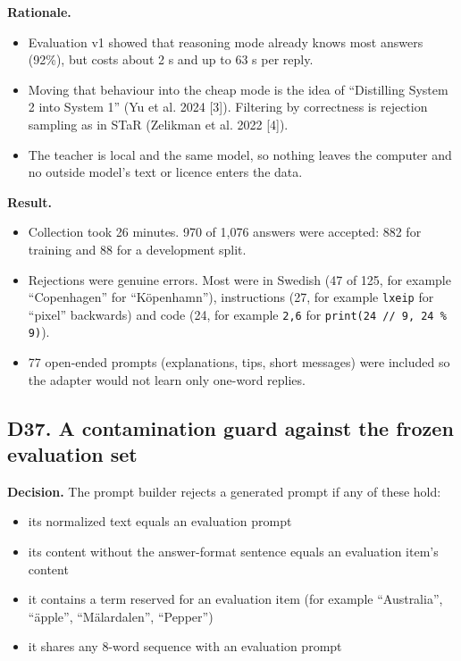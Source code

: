 \documentclass[11pt,a4paper]{article}
\newcommand{\code}[1]{\texttt{#1}}
\begin{document}
\textbf{Rationale.}

\begin{itemize}
\item Evaluation v1 showed that reasoning mode already knows most answers (92\%), but costs about 2 s and up to 63 s per reply.
\item Moving that behaviour into the cheap mode is the idea of ``Distilling System 2 into System 1'' (Yu et al. 2024 [3]). Filtering by correctness is rejection sampling as in STaR (Zelikman et al. 2022 [4]).
\item The teacher is local and the same model, so nothing leaves the computer and no outside model's text or licence enters the data.
\end{itemize}

\textbf{Result.}

\begin{itemize}
\item Collection took 26 minutes. 970 of 1,076 answers were accepted: 882 for training and 88 for a development split.
\item Rejections were genuine errors. Most were in Swedish (47 of 125, for example ``Copenhagen'' for ``K\"openhamn''), instructions (27, for example \code{lxeip} for ``pixel'' backwards) and code (24, for example \code{2,6} for \code{print(24 // 9, 24 \% 9)}).
\item 77 open-ended prompts (explanations, tips, short messages) were included so the adapter would not learn only one-word replies.
\end{itemize}

\subsection{D37. A contamination guard against the frozen evaluation set}

\textbf{Decision.} The prompt builder rejects a generated prompt if any of these hold:

\begin{itemize}
\item its normalized text equals an evaluation prompt
\item its content without the answer-format sentence equals an evaluation item's content
\item it contains a term reserved for an evaluation item (for example ``Australia'', ``\"apple'', ``M\"alardalen'', ``Pepper'')
\item it shares any 8-word sequence with an evaluation prompt
\end{itemize}
\end{document}
